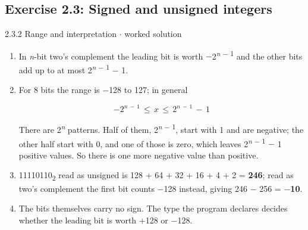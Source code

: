 \documentclass[11pt]{article}
\begin{document}
\begin{keepsection}\subsection{Exercise 2.3: Signed and unsigned integers}

\begin{workedbox}{2.3.2 Range and interpretation \ensuremath{\cdot} worked solution}
\begin{enumerate}
\item In \textit{n}-bit two's complement the leading bit is worth \ensuremath{-}2\textsuperscript{\textit{n} \ensuremath{-} 1} and the other bits add up to at most 2\textsuperscript{\textit{n} \ensuremath{-} 1} \ensuremath{-} 1.
\item {}
For 8 bits the range is \ensuremath{-}128 to 127; in general

\begin{equation*}-2^{{n}\, -\, 1}\, \leq \, {x}\, \leq \, 2^{{n}\, -\, 1}\, -\, 1\end{equation*}

There are 2\textsuperscript{\textit{n}} patterns. Half of them, 2\textsuperscript{\textit{n} \ensuremath{-} 1}, start with 1 and are negative; the other half start with 0, and one of those is zero, which leaves 2\textsuperscript{\textit{n} \ensuremath{-} 1} \ensuremath{-} 1 positive values. So there is one more negative value than positive.
\item 11110110\textsubscript{2} read as unsigned is 128 + 64 + 32 + 16 + 4 + 2 = \textbf{246}; read as two's complement the first bit counts \ensuremath{-}128 instead, giving 246 \ensuremath{-} 256 = \textbf{\ensuremath{-}10}.
\item The bits themselves carry no sign. The type the program declares decides whether the leading bit is worth +128 or \ensuremath{-}128.
\end{enumerate}
\end{workedbox}

\end{keepsection}
\end{document}
